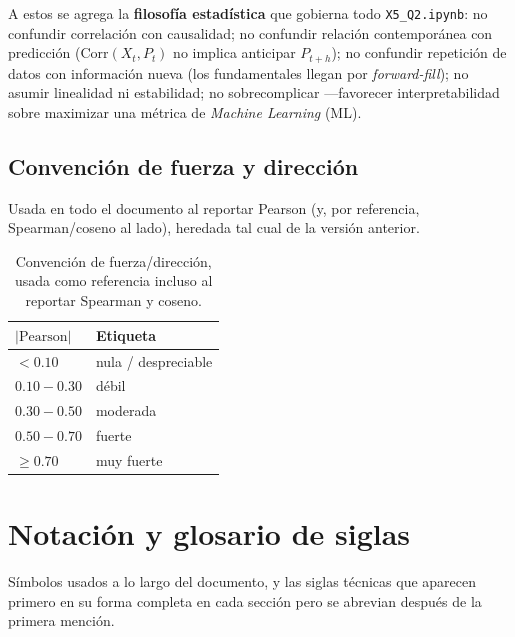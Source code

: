 \documentclass[11pt,a4paper]{article}
\newcommand{\code}[1]{\texttt{\small #1}}
\newcommand{\bigsep}{\par\vspace{3pt}}
\begin{document}
\bigsep
A estos se agrega la \textbf{filosofía estadística} que gobierna todo \code{X5\_Q2.ipynb}:
no confundir correlación con causalidad; no confundir relación contemporánea con
predicción (\(\mathrm{Corr}(X_t,P_t)\) no implica anticipar \(P_{t+h}\)); no confundir
repetición de datos con información nueva (los fundamentales llegan por
\emph{forward-fill}); no asumir linealidad ni estabilidad; no sobrecomplicar —favorecer
interpretabilidad sobre maximizar una métrica de \emph{Machine Learning} (ML).

\subsection{Convención de fuerza y dirección}
\label{ssec:convencion-fuerza}

Usada en todo el documento al reportar Pearson (y, por referencia, Spearman/coseno al
lado), heredada tal cual de la versión anterior.

\begin{table}[h]
\centering
\small
\begin{tabular}{@{}l l@{}}
\toprule
\(|\text{Pearson}|\) & Etiqueta \\
\midrule
\(< 0.10\) & nula / despreciable \\
\(0.10 - 0.30\) & débil \\
\(0.30 - 0.50\) & moderada \\
\(0.50 - 0.70\) & fuerte \\
\(\geq 0.70\) & muy fuerte \\
\bottomrule
\end{tabular}
\caption{Convención de fuerza/dirección, usada como referencia incluso al reportar Spearman
y coseno.}
\end{table}

\newpage
\section{Notación y glosario de siglas}
\label{sec:notacion}

Símbolos usados a lo largo del documento, y las siglas técnicas que aparecen primero en su
forma completa en cada sección pero se abrevian después de la primera mención.
\end{document}
